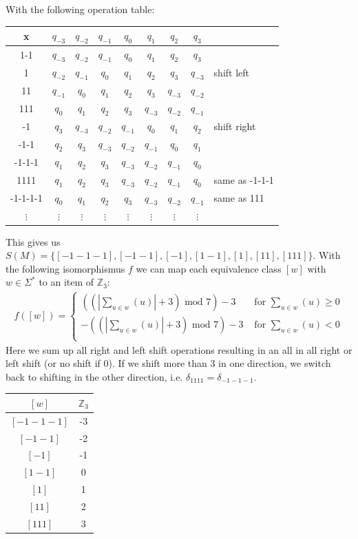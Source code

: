 \documentclass[a4paper,12pt,numbers=noenddot]{scrreport}
\begin{document}
With the following operation table:
\begin{center}
\begin{tabular}{c|ccccccc|l}
    x & $q_{-3}$ & $q_{-2}$ & $q_{-1}$ & $q_{0}$ & $q_{1}$ & $q_{2}$ & $q_3$   \\ \hline
    1-1 & $q_{-3}$ & $q_{-2}$ & $q_{-1}$ & $q_{0}$ & $q_{1}$ & $q_{2}$ & $q_3$   \\ \hline
    1 & $q_{-2}$ & $q_{-1}$ & $q_{0}$ & $q_{1}$ & $q_{2}$ & $q_{3}$ & $q_{-3}$ & shift left  \\ 
    11 & $q_{-1}$ & $q_{0}$ & $q_{1}$ & $q_{2}$ & $q_{3}$ & $q_{-3}$ & $q_{-2}$   \\ 
    111 & $q_{0}$ & $q_{1}$ & $q_{2}$ & $q_{3}$ & $q_{-3}$ & $q_{-2}$ & $q_{-1}$   \\  \hline
    -1 & $q_{3}$ & $q_{-3}$ & $q_{-2}$ & $q_{-1}$ & $q_{0}$ & $q_{1}$ & $q_{2}$  & shift right \\ 
    -1-1 & $q_{2}$ & $q_{3}$ & $q_{-3}$ & $q_{-2}$ & $q_{-1}$ & $q_{0}$ & $q_{1}$   \\ 
    -1-1-1 & $q_{1}$ & $q_{2}$ & $q_{3}$ & $q_{-3}$ & $q_{-2}$ & $q_{-1}$ & $q_{0}$   \\ \hline
    1111 & $q_{1}$ & $q_{2}$ & $q_{3}$ & $q_{-3}$ & $q_{-2}$ & $q_{-1}$ & $q_{0}$ & same as -1-1-1  \\ 
    -1-1-1-1 & $q_{0}$ & $q_{1}$ & $q_{2}$ & $q_{3}$ & $q_{-3}$ & $q_{-2}$ & $q_{-1}$ & same as 111  \\  \hline
$\vdots$ & $\vdots$ & $\vdots$& $\vdots$& $\vdots$& $\vdots$& $\vdots$ & $\vdots$ & \\
\end{tabular}
\end{center}

This gives us $S(M) = \{[-1-1-1], [-1-1], [-1], [1-1], [1], [11], [111]\}$.
With the following isomorphismus $f$ we can map each equivalence class $[w]$ with $w \in \Sigma^*$ to an item of $\mathbb{Z}_3$:
\begin{align*}
    f([w]) = 
    \begin{cases}
        ((|\sum_{u \in w}(u)| + 3) \text{ mod } 7) - 3 & \text{ for } \sum_{u \in w}(u) \geq 0 \\
        -((|\sum_{u \in w}(u)| + 3) \text{ mod } 7) - 3 & \text{ for } \sum_{u \in w}(u) < 0 \\
    \end{cases}
\end{align*}
Here we sum up all right and left shift operations resulting in an all in all right or left shift (or no shift if 0).
If we shift more than 3 in one direction,  we switch back to shifting in the other direction, i.e. $\delta_{1111} = \delta_{-1-1-1}$.

\begin{center}
\begin{tabular}{c|c}
    $[w]$ &  $\mathbb{Z}_3$ \\ \hline
    $[-1-1-1]$ & -3\\ 
    $[-1-1]$ & -2\\ 
    $[-1]$ & -1\\ 
    $[1-1]$ & 0\\ 
    $[1]$ & 1\\ 
    $[11]$ & 2\\ 
    $[111]$ & 3\\ 
\end{tabular}
\end{center}
\end{document}

